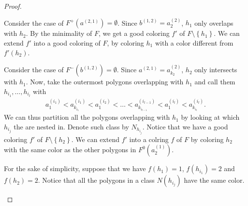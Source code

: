 \documentclass[12pt]{article}
\theoremstyle{definition}
\begin{document}
\begin{proof}
\begin{itemize}
             Consider the case of
             $F^{+}\left(a^{\left(2, 1\right)}\right) = \emptyset$.
             Since $b^{\left(1, 2\right)} =
             a_{2}^{\left(2\right)}$, $h_1$ only
             overlaps with $h_2$.
             By the minimality of $F$, 
             we get a good coloring 
             $f'$ of $F \setminus \left\{h_1\right\}$.
             We can extend $f'$ into 
             a good coloring of $F$,
             by coloring $h_1$ with 
             a color different from
             $f'\left(h_2\right)$.

             Consider the case of
             $F^{-}\left(b^{\left(1, 2\right)}\right) = \emptyset$.
             Since $a^{\left(2, 1\right)} = 
             a_{k_2}^{\left(2\right)}$,
             $h_2$ only intersects with $h_1$.
             Now, take the outermost polygons
             overlapping with $h_1$ and
             call them $h_{i_1}, \ldots, h_{i_{l}}$ with
             \begin{gather*}
                 a_1^{\left(i_1\right)} <
                 a_{k_{i_1}}^{\left(i_1\right)} <
                 a_1^{\left(i_2\right)} < 
                 \ldots <
                 a_{k_{i_{l - 1}}}^{\left(i_{l - 1}\right)} <
                 a_1^{\left(i_{l}\right)} <
                 a_{k_{i_{l}}}^{\left(i_{l}\right)}.
             \end{gather*}
             We can thus partition all the
             polygons overlapping with
             $h_1$ by looking at which $h_{i_{j}}$ 
             the are nested in. Denote
             such class by $N_{h_{i_{j}}}$.
             Notice that we have a good coloring
             $f'$ of $F \setminus \left\{h_2\right\}$.
             We can extend $f'$ into a colring
             $f$ of $F$ by coloring $h_2$ with
             the same color as the other polygons in
             $F^{0}\left(a_2^{\left(1\right)}\right)$.

             For the sake of simplicity,
             suppose that we have
             $f\left(h_1\right) = 1$,
             $f\left(h_{i_1}\right) = 2$ and
             $f\left(h_2\right) = 2$.
             Notice that all the polygons
             in a class $N\left(h_{i_{j}}\right)$ 
             have the same color.


\end{itemize}
\end{proof}
\end{document}
